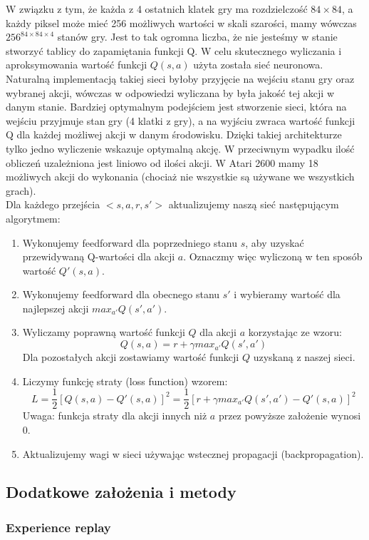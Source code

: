 \documentclass[12pt]{article}
\begin{document}
W związku z tym, że każda z 4 ostatnich klatek gry ma rozdzielczość $84\times 84$, a każdy piksel może mieć 256 możliwych wartości w skali szarości, mamy wówczas $256^{84\times84\times4}$ stanów gry. Jest to tak ogromna liczba, że nie jesteśmy w stanie stworzyć tablicy do zapamiętania funkcji Q.
W celu skutecznego wyliczania i aproksymowania wartość funkcji $Q(s,a)$ użyta została sieć neuronowa. Naturalną implementacją takiej sieci byłoby przyjęcie na wejściu stanu gry oraz wybranej akcji, wówczas w odpowiedzi wyliczana by była jakość tej akcji w danym stanie. Bardziej optymalnym podejściem jest stworzenie sieci, która na wejściu przyjmuje stan gry (4 klatki z gry), a na wyjściu zwraca wartość funkcji Q dla każdej możliwej akcji w danym środowisku. Dzięki takiej architekturze tylko jedno wyliczenie wskazuje optymalną akcję. W przeciwnym wypadku ilość obliczeń uzależniona jest liniowo od ilości akcji. W Atari 2600 mamy 18 możliwych akcji do wykonania (chociaż nie wszystkie są używane we wszystkich grach).
\\
Dla każdego przejścia $<s, a, r, s'>$ aktualizujemy naszą sieć następującym algorytmem:
\begin{enumerate}
\item Wykonujemy feedforward dla poprzedniego stanu $s$, aby uzyskać przewidywaną Q-wartości dla akcji $a$. Oznaczmy więc wyliczoną w ten sposób wartość $Q'(s,a)$.
\item Wykonujemy feedforward dla obecnego stanu $s'$ i wybieramy wartość dla najlepszej akcji $max_{a'}Q(s',a')$.
\item Wyliczamy poprawną wartość funkcji $Q$ dla akcji $a$ korzystając ze wzoru: $$Q(s, a) = r + \gamma max_{a'}Q(s',a')$$ Dla pozostałych akcji zostawiamy wartość funkcji $Q$ uzyskaną z naszej sieci.
\item Liczymy funkcję straty (loss function) wzorem: $$L=\frac{1}{2}[Q(s,a)-Q'(s,a)]^2=\frac{1}{2}[r+\gamma max_{a'}Q(s',a')-Q'(s,a)]^2$$ Uwaga: funkcja straty dla akcji innych niż $a$ przez powyższe założenie wynosi 0. 
\item Aktualizujemy wagi w sieci używając wstecznej propagacji (backpropagation).
\end{enumerate}

\subsection{Dodatkowe założenia i metody}

\subsubsection{Experience replay}
\end{document}
